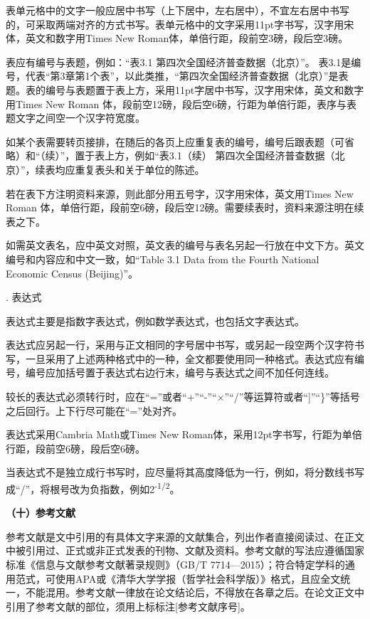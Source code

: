 \documentclass{Diploma}
\begin{document}
表单元格中的文字一般应居中书写（上下居中，左右居中），不宜左右居中书写的，可采取两端对齐的方式书写。表单元格中的文字采用11pt字书写，汉字用宋体，英文和数字用Times New Roman体，单倍行距，段前空3磅，段后空3磅。

表应有编号与表题，例如：“表3.1 第四次全国经济普查数据（北京）”。 表3.1是编号，代表“第3章第1个表”，以此类推，“第四次全国经济普查数据（北京）”是表题。表的编号与表题置于表上方，采用11pt字居中书写，汉字用宋体，英文和数字用Times New Roman 体，段前空12磅，段后空6磅，行距为单倍行距，表序与表题文字之间空一个汉字符宽度。

如某个表需要转页接排，在随后的各页上应重复表的编号，编号后跟表题（可省略）和“（续）”，置于表上方，例如“表3.1（续） 第四次全国经济普查数据（北京）”，续表均应重复表头和关于单位的陈述。

若在表下方注明资料来源，则此部分用五号字，汉字用宋体，英文用Times New Roman 体，单倍行距，段前空6磅，段后空12磅。需要续表时，资料来源注明在续表之下。

如需英文表名，应中英文对照，英文表的编号与表名另起一行放在中文下方。英文编号和内容应和中文一致，如“Table 3.1 Data from the Fourth National Economic Census (Beijing)”。

. 表达式

表达式主要是指数字表达式，例如数学表达式，也包括文字表达式。

表达式应另起一行，采用与正文相同的字号居中书写，或另起一段空两个汉字符书写，一旦采用了上述两种格式中的一种，全文都要使用同一种格式。表达式应有编号，编号应加括号置于表达式右边行末，编号与表达式之间不加任何连线。

较长的表达式必须转行时，应在“=”或者“+”“-”“×”“/”等运算符或者“]”“\}”等括号之后回行。上下行尽可能在“=”处对齐。

表达式采用Cambria Math或Times New Roman体，采用12pt字书写，行距为单倍行距，段前空6磅，段后空6磅。

当表达式不是独立成行书写时，应尽量将其高度降低为一行，例如，将分数线书写成“/”，将根号改为负指数，例如2\textsuperscript{-1/2}。

\noindent\textbf{（十）参考文献}

参考文献是文中引用的有具体文字来源的文献集合，列出作者直接阅读过、在正文中被引用过、正式或非正式发表的刊物、文献及资料。参考文献的写法应遵循国家标准《信息与文献参考文献著录规则》（GB/T 7714—2015）；符合特定学科的通用范式，可使用APA或《清华大学学报（哲学社会科学版）》格式，且应全文统一，不能混用。参考文献一律放在论文结论后，不得放在各章之后。在论文正文中引用了参考文献的部位，须用上标标注[参考文献序号]。
\end{document}
